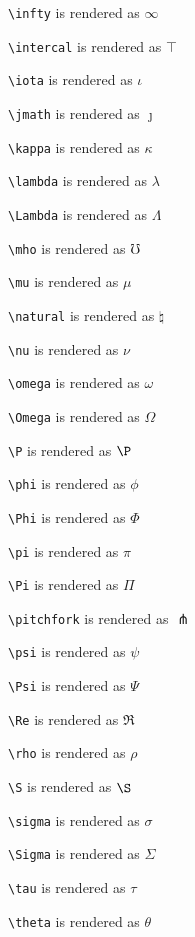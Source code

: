 \texttt{\textbackslash infty} is rendered as $\infty$


\texttt{\textbackslash intercal} is rendered as $\intercal$


\texttt{\textbackslash iota} is rendered as $\iota$


\texttt{\textbackslash jmath} is rendered as $\jmath$


\texttt{\textbackslash kappa} is rendered as $\kappa$


\texttt{\textbackslash lambda} is rendered as $\lambda$


\texttt{\textbackslash Lambda} is rendered as $\Lambda$


\texttt{\textbackslash mho} is rendered as $\mho$


\texttt{\textbackslash mu} is rendered as $\mu$


\texttt{\textbackslash natural} is rendered as $\natural$


\texttt{\textbackslash nu} is rendered as $\nu$


\texttt{\textbackslash omega} is rendered as $\omega$


\texttt{\textbackslash Omega} is rendered as $\Omega$


\texttt{\textbackslash P} is rendered as $\P$


\texttt{\textbackslash phi} is rendered as $\phi$


\texttt{\textbackslash Phi} is rendered as $\Phi$


\texttt{\textbackslash pi} is rendered as $\pi$


\texttt{\textbackslash Pi} is rendered as $\Pi$


\texttt{\textbackslash pitchfork} is rendered as $\pitchfork$


\texttt{\textbackslash psi} is rendered as $\psi$


\texttt{\textbackslash Psi} is rendered as $\Psi$


\texttt{\textbackslash Re} is rendered as $\Re$


\texttt{\textbackslash rho} is rendered as $\rho$


\texttt{\textbackslash S} is rendered as $\S$


\texttt{\textbackslash sigma} is rendered as $\sigma$


\texttt{\textbackslash Sigma} is rendered as $\Sigma$


\texttt{\textbackslash tau} is rendered as $\tau$


\texttt{\textbackslash theta} is rendered as $\theta$


